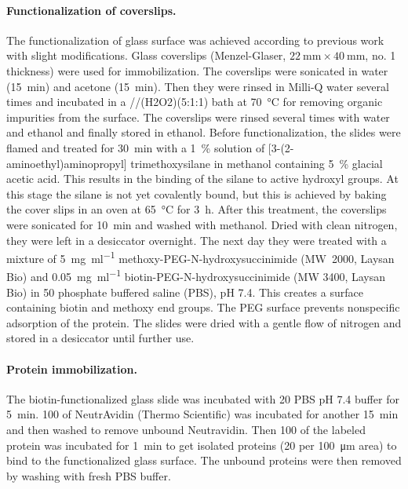 \paragraph*{Functionalization of coverslips.}
The functionalization of glass surface was achieved according to previous work with slight modifications.\cite{gupta2012involvement}
Glass coverslips (Menzel-Glaser, $\SI{22}{\mm} \times \SI{40}{\mm}$, no. 1 thickness) were used for immobilization.
The coverslips were sonicated in water (\SI{15}{\minute}) and acetone (\SI{15}{\minute}).
Then they were rinsed in Milli-Q water several times and incubated in a //\ce(H2O2)(5:1:1) bath at \SI{70}{\celsius} for removing organic impurities from the surface.
The coverslips were rinsed several times with water and ethanol and finally stored in ethanol.
Before functionalization, the slides were flamed and treated for \SI{30}{\minute} with a \SI{1}{\percent} solution of [3-(2-aminoethyl)aminopropyl] trimethoxysilane in methanol containing \SI{5}{\percent} glacial acetic acid. This results in the binding of the silane to active hydroxyl groups.
At this stage the silane is not yet covalently bound, but this is achieved by baking the cover slips in an oven at \SI{65}{\celsius} for \SI{3}{\hour}.
After this treatment, the coverslips were sonicated for \SI{10}{\minute} and washed with methanol.
Dried with clean nitrogen, they were left in a desiccator overnight. 
The next day they were treated with a mixture of \SI{5}{\mg\per\ml} methoxy-PEG-N-hydroxysuccinimide (MW~2000, Laysan Bio) and \SI{0.05}{\mg\per\ml} biotin-PEG-N-hydroxysuccinimide (MW 3400, Laysan Bio) in \SI{50}{\mM} phosphate buffered saline (PBS), pH 7.4.
This creates a surface containing biotin and methoxy end groups.
The PEG surface prevents nonspecific adsorption of the protein.
The slides were dried with a gentle flow of nitrogen and stored in a desiccator until further use.

\paragraph*{Protein immobilization.}
The biotin-functionalized glass slide was incubated with \SI{20}{\mM} PBS pH 7.4 buffer for \SI{5}{\minute}.
\SI{100}{\nM} of NeutrAvidin (Thermo Scientific) was incubated for another \SI{15}{\minute} and then washed to remove unbound Neutravidin. 
Then \SI{100}{\pM} of the labeled protein was incubated for \SI{1}{\minute} to get isolated proteins (20 per \SI{100}{\um} area) to bind to the functionalized glass surface.
The unbound proteins were then removed by washing with fresh PBS buffer.

